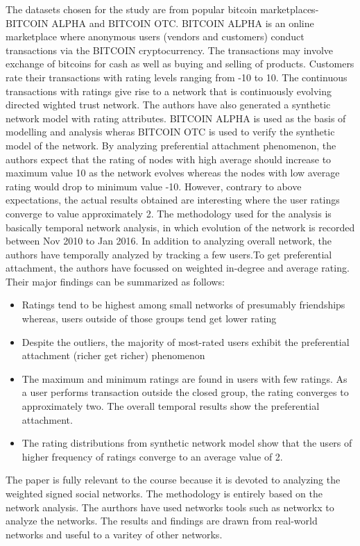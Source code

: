 The datasets chosen for the study are from popular bitcoin marketplaces- BITCOIN ALPHA and BITCOIN OTC. BITCOIN ALPHA is an online marketplace where anonymous users (vendors and customers) conduct transactions via the BITCOIN cryptocurrency. The transactions may involve exchange of bitcoins for cash as well as buying and selling of products. Customers rate their transactions with rating levels ranging from -10 to 10. The continuous transactions with ratings give rise to a network that is continuously evolving directed wighted trust network. The authors have also generated a synthetic network model with rating attributes. BITCOIN ALPHA is used as the basis of modelling and analysis wheras BITCOIN OTC is used to verify the synthetic model of the network. By analyzing preferential attachment phenomenon, the authors expect that the rating of nodes with high average should increase to maximum value 10 as the network evolves whereas the nodes with low average rating would drop to minimum value -10. However, contrary to above expectations, the actual results obtained are interesting where the user ratings converge to value approximately 2.
The methodology used for the analysis is basically temporal network analysis, in which evolution of the network is recorded between Nov 2010 to Jan 2016. In addition to analyzing overall network, the authors have temporally analyzed by tracking a few users.To get preferential attachment, the authors have focussed on weighted in-degree and average rating. Their major findings can be summarized as follows:
\begin{itemize}
	\denseitems
	\item 
	Ratings tend to be highest among small networks of presumably friendships whereas, users outside of those groups tend get lower rating
	\item 
	Despite the outliers, the majority of most-rated users exhibit the preferential attachment (richer get richer) phenomenon
	\item 
	The maximum and minimum ratings are found in users with few ratings. As a user performs transaction outside the closed group, the rating converges to approximately two. The overall temporal results show the preferential attachment.
	\item 
	The rating distributions from synthetic network model show that the users of higher frequency of ratings converge to an average value of 2.
	
\end{itemize}

The paper is fully relevant to the course because it is devoted to analyzing the weighted signed social networks. The methodology is entirely based on the network analysis. The aurthors have used networks tools such as networkx to analyze the networks. The results and findings are drawn from real-world networks and useful to a varitey of other networks.

